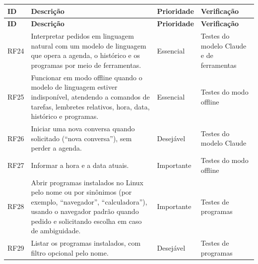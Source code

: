 \begin{singlespace}
\label{qua:rf-inteligencia}
\small
\begin{tabularx}{\textwidth}{|C{1.25cm}|L|C{2.0cm}|P{3.2cm}|}
\hline
\textbf{ID} & \textbf{Descrição} & \textbf{Prioridade} & \textbf{Verificação} \\ \hline
\endfirsthead
\hline
\textbf{ID} & \textbf{Descrição} & \textbf{Prioridade} & \textbf{Verificação} \\ \hline
\endhead
RF24 & Interpretar pedidos em linguagem natural com um modelo de linguagem que opera a agenda, o histórico
       e os programas por meio de ferramentas. & Essencial & Testes do modelo Claude e de ferramentas \\ \hline
RF25 & Funcionar em modo offline quando o modelo de linguagem estiver indisponível, atendendo a comandos de
       tarefas, lembretes relativos, hora, data, histórico e programas. & Essencial & Testes do modo offline \\ \hline
RF26 & Iniciar uma nova conversa quando solicitado (“nova conversa”), sem perder a agenda. & Desejável & Testes do modelo Claude \\ \hline
RF27 & Informar a hora e a data atuais. & Importante & Testes do modo offline \\ \hline
RF28 & Abrir programas instalados no Linux pelo nome ou por sinônimos (por exemplo, “navegador”,
       “calculadora”), usando o navegador padrão quando pedido e solicitando escolha em caso de
       ambiguidade. & Importante & Testes de programas \\ \hline
RF29 & Listar os programas instalados, com filtro opcional pelo nome. & Desejável & Testes de programas \\ \hline
\end{tabularx}
\end{singlespace}

